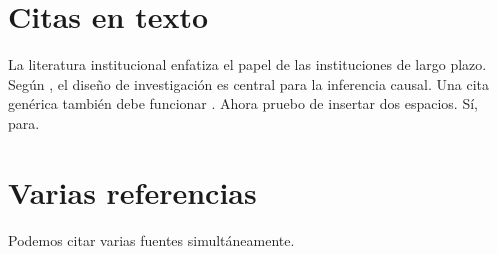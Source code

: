 \documentclass{article}
\begin{document}
\section{Citas en texto}
\label{sec:prueba}

La literatura institucional enfatiza el papel de las instituciones de largo plazo.
Según \citet{angrist2009}, el diseño de investigación es central para la inferencia causal.
Una cita genérica también debe funcionar \cite{heckman1979}. Ahora pruebo de insertar dos espacios. Sí, para.

\section{Varias referencias}
Podemos citar varias fuentes simultáneamente.


\end{document}
